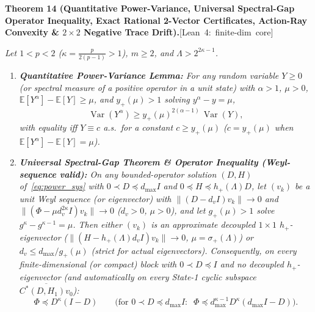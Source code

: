 \documentclass[10pt,letterpaper]{article}
\newcommand{\leanbadge}[1]{\mbox{\sffamily\scriptsize\color{leanborder}[#1]}}
\newcommand{\Var}{\operatorname{Var}}
\begin{document}
\begin{tcolorbox}[mathbox]
\textbf{Theorem 14 (Quantitative Power-Variance, Universal Spectral-Gap Operator Inequality, Exact Rational 2-Vector Certificates, Action-Ray Convexity \& $2\times 2$ Negative Trace Drift).}\hfill\leanbadge{Lean~4: finite-dim core}\par\vspace{1.5pt}
\emph{Let $1 < p < 2$ ($\kappa = \frac{p}{2(p-1)} > 1$), $m \ge 2$, and $\Lambda > 2^{2\kappa-1}$.}
\begin{enumerate}[label=(\alph*),leftmargin=1.8em,itemsep=2pt,topsep=2pt]
  \item \emph{\textbf{Quantitative Power-Variance Lemma:} For any random variable $Y \ge 0$ (or spectral measure of a positive operator in a unit state) with $\alpha > 1$, $\mu > 0$, $\mathbb{E}[Y^\alpha] - \mathbb{E}[Y] \ge \mu$, and $y_+(\mu) > 1$ solving $y^\alpha - y = \mu$,}
  \[
    \Var(Y^\alpha) \ge y_+(\mu)^{2(\alpha - 1)}\,\Var(Y),
  \]
  \emph{with equality iff $Y \equiv c$ a.s.\ for a constant $c \ge y_+(\mu)$ ($c = y_+(\mu)$ when $\mathbb{E}[Y^\alpha] - \mathbb{E}[Y] = \mu$).}
  \item \emph{\textbf{Universal Spectral-Gap Theorem \& Operator Inequality (Weyl-sequence valid):} On any bounded-operator solution $(D, H)$ of~\eqref{eq:power_sys} with $0 \prec D \preceq d_{\max} I$ and $0 \preceq H \preceq h_+(\Lambda) D$, let $(v_k)$ be a unit Weyl sequence (or eigenvector) with $\|(D - d_v I)v_k\| \to 0$ and $\|(\Phi - \mu d_v^{2\kappa} I)v_k\| \to 0$ ($d_v > 0$, $\mu > 0$), and let $g_+(\mu) > 1$ solve $g^\kappa - g^{\kappa-1} = \mu$. Then either $(v_k)$ is an approximate decoupled $1\times 1$ $h_+$-eigenvector ($\|(H - h_+(\Lambda) d_v I)v_k\| \to 0$, $\mu = \sigma_+(\Lambda)$) or $d_v \le d_{\max}/g_+(\mu)$ (strict for actual eigenvectors). Consequently, on every finite-dimensional (or compact) block with $0 \prec D \preceq I$ and no decoupled $h_+$-eigenvector (and automatically on every State-1 cyclic subspace $\overline{C^*(D, H_1)v_0}$):}
  \begin{equation}\label{eq:univ_spec_gap}
    \Phi \preceq D^\kappa (I - D) \qquad \bigl(\text{for } 0 \prec D \preceq d_{\max} I:\;\; \Phi \preceq d_{\max}^{\kappa - 1} D^\kappa(d_{\max} I - D)\bigr).
  \end{equation}

\end{enumerate}
\end{tcolorbox}
\end{document}
